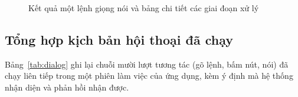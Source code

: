 \begin{figure}[!htbp]
\centering
{}
\caption{Kết quả một lệnh giọng nói và bảng chi tiết các giai đoạn xử lý}\label{fig:voice}
\end{figure}

\subsection{Tổng hợp kịch bản hội thoại đã chạy}
Bảng~\ref{tab:dialog} ghi lại chuỗi mười lượt tương tác (gõ lệnh, bấm nút, nói) đã chạy liên tiếp trong một phiên làm việc của ứng dụng, kèm ý định mà hệ thống nhận diện và phản hồi nhận được.

